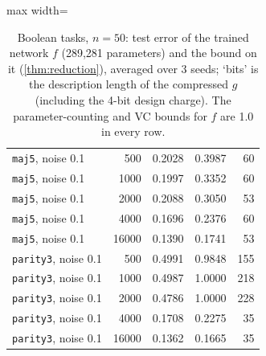 \begin{table}[t]
\begin{adjustbox}{max width=\linewidth}
\begin{tabular}{l r r r r}
\addlinespace[2pt]
\texttt{maj5}, noise 0.1 & 500 & 0.2028 & 0.3987 & 60 \\
\texttt{maj5}, noise 0.1 & 1000 & 0.1997 & 0.3352 & 60 \\
\texttt{maj5}, noise 0.1 & 2000 & 0.2088 & 0.3050 & 53 \\
\texttt{maj5}, noise 0.1 & 4000 & 0.1696 & 0.2376 & 60 \\
\texttt{maj5}, noise 0.1 & 16000 & 0.1390 & 0.1741 & 53 \\
\addlinespace[2pt]
\texttt{parity3}, noise 0.1 & 500 & 0.4991 & 0.9848 & 155 \\
\texttt{parity3}, noise 0.1 & 1000 & 0.4987 & 1.0000 & 218 \\
\texttt{parity3}, noise 0.1 & 2000 & 0.4786 & 1.0000 & 228 \\
\texttt{parity3}, noise 0.1 & 4000 & 0.1708 & 0.2275 & 35 \\
\texttt{parity3}, noise 0.1 & 16000 & 0.1362 & 0.1665 & 35 \\
\bottomrule
\end{tabular}\end{adjustbox}
\caption{Boolean tasks, $n=50$: test error of the trained network $f$ (289,281 parameters) and the bound on it (\cref{thm:reduction}), averaged over 3 seeds; `bits' is the description length of the compressed $g$ (including the 4-bit design charge). The parameter-counting and VC bounds for $f$ are 1.0 in every row.}\label{tab:boolean}
\end{table}
